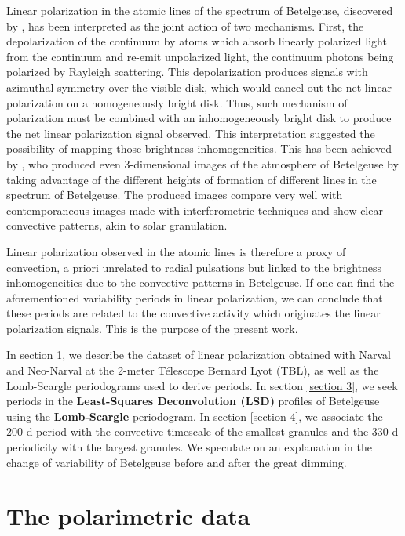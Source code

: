 \documentclass{aa}
\begin{document}
Linear polarization in the atomic lines of the spectrum of Betelgeuse, discovered by \cite{auriere_discovery_2016}, has been interpreted as the joint action of 
two mechanisms. First, the depolarization of the continuum by atoms which absorb linearly polarized light from the continuum and re-emit unpolarized light,
the continuum photons being polarized by Rayleigh scattering. This depolarization produces signals with azimuthal symmetry over the visible disk, which would  cancel out the net linear polarization on a homogeneously bright disk. Thus, such mechanism of polarization must be combined with an inhomogeneously bright disk to produce the net linear polarization 
signal observed. This interpretation suggested the possibility of mapping those brightness inhomogeneities. This has been achieved by \cite{lopez_ariste_convective_2018}, who produced even 3-dimensional images of the atmosphere of Betelgeuse \citep{lopez_ariste_three-dimensional_2022} by taking advantage of the different heights of formation of 
different lines in the spectrum of Betelgeuse. The produced images compare very well with contemporaneous images made with interferometric 
techniques \citep{montarges_close_2016} and show clear convective patterns, akin to solar granulation.\

Linear polarization observed in the atomic lines is therefore a proxy of convection, a priori unrelated to radial 
pulsations but linked to the brightness inhomogeneities due to the convective patterns in Betelgeuse. If one can find the aforementioned variability periods 
in linear polarization, we can conclude that these periods are related to the convective activity which originates the linear polarization signals.
This is the purpose of the present work.\

In section \ref{Section 2}, we describe the dataset of linear polarization obtained with Narval and Neo-Narval at the 2-meter Télescope Bernard Lyot (TBL), as well as the Lomb-Scargle periodograms used to derive periods. In section \ref{section 3}, we seek periods in the \textbf{Least-Squares Deconvolution (LSD)} profiles of Betelgeuse using the \textbf{Lomb-Scargle} periodogram. In section \ref{section 4}, we associate the 200 d period with the convective timescale of the smallest granules and the 330 d periodicity with the largest granules. We speculate on an explanation in the change of variability of Betelgeuse before and after the great dimming. 


\section{The polarimetric data}
\label{Section 2}
\end{document}
